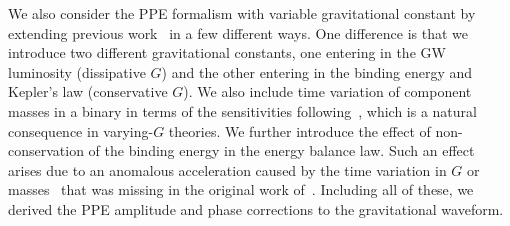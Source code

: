 \documentclass[prd,twocolumn,nofootinbib]{revtex4-1}
\begin{document}
We also consider the PPE formalism with variable gravitational constant by extending previous work~\cite{Yunes:2009bv} in a few different ways. One difference is that we introduce two different gravitational constants, one entering in the GW luminosity (dissipative $G$) and the other entering in the binding energy and Kepler's law (conservative $G$). We also include time variation of component masses in a binary in terms of the sensitivities following~\cite{PhysRevLett.65.953}, which is a natural consequence in varying-$G$ theories. We further introduce the effect of non-conservation of the binding energy in the energy balance law. Such an effect arises due to an anomalous acceleration caused by the time variation in $G$ or masses~\cite{PhysRevLett.65.953} that was missing in the original work of~\cite{Yunes:2009bv}.  Including all of these, we derived the PPE amplitude and phase corrections to the gravitational waveform.

\end{document}
